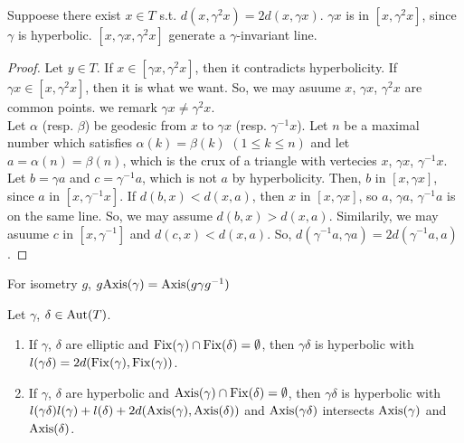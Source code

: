 \begin{remark}
  Suppoese there exist $x \in T$ s.t. $d(x,\gamma^2 x) = 2 d(x,\gamma x)$.
  $\gamma x$ is in $[x,\gamma^2 x]$, since $\gamma$ is hyperbolic.
  $[x,\gamma x, \gamma^2 x]$ generate a $\gamma$-invariant line. 
\end{remark}

\begin{proof}
  Let $y \in T$.
  If $x \in [\gamma x, \gamma^2 x]$, then it contradicts hyperbolicity.
  If $\gamma x \in [x, \gamma^2 x]$, then it is what we want.
  So, we may asuume $x$, $\gamma x$, $\gamma^2 x$ are common points.
  we remark $\gamma x \neq \gamma^2 x$.\\
  Let $\alpha$ (resp. $\beta$) be geodesic from $x$ to $\gamma x$ (resp. $\gamma^{-1} x$).
  Let $n$ be a maximal number which satisfies $\alpha(k)=\beta(k)$ $(1 \leq k \leq n)$ and
  let $a = \alpha(n) = \beta(n)$, which is the crux of a triangle with vertecies $x$, $\gamma x$, $\gamma^{-1}x$.
  Let $b = \gamma a$ and $c = \gamma^{-1}a$, which is not $a$ by hyperbolicity.
  Then, $b$ in $[x,\gamma x]$, since $a$ in $[x,\gamma^{-1}x]$. 
  If $d(b,x) < d(x,a)$, then $x$ in $[x,\gamma x]$, so $a$, $\gamma a$, $\gamma^{-1} a$ is on the same line.
  So, we may assume $d(b,x) > d(x,a)$.
  Similarily, we may asuume $c$ in $[x,\gamma^{-1}]$ and $d(c,x) < d(x,a)$.
  So, $d(\gamma^{-1} a,\gamma a) = 2 d(\gamma^{-1} a,a)$.
\end{proof}

\begin{remark}
  For isometry $g$, $g {\rm Axis}(\gamma) = {\rm Axis}(g \gamma g^{-1})$
\end{remark}

\begin{proposition}
  Let $\gamma$, $\delta \in {\rm Aut}(T)$.
  \begin{enumerate}
  \item If $\gamma$, $\delta$ are elliptic and ${\rm Fix}(\gamma) \cap {\rm Fix}(\delta) = \emptyset$,
    then $\gamma \delta$ is hyperbolic with $l(\gamma \delta) = 2d({\rm Fix}(\gamma),{\rm Fix}(\gamma))$.
  \item  If $\gamma$, $\delta$ are hyperbolic and ${\rm Axis}(\gamma) \cap {\rm Fix}(\delta) = \emptyset$,
    then $\gamma \delta$ is hyperbolic with $l(\gamma \delta) l(\gamma) + l(\delta) + 2d({\rm Axis}(\gamma),{\rm Axis}(\delta))$
    and ${\rm Axis} (\gamma \delta)$ intersects ${\rm Axis} (\gamma)$ and ${\rm Axis}(\delta)$.
  \end{enumerate}
\end{proposition}


